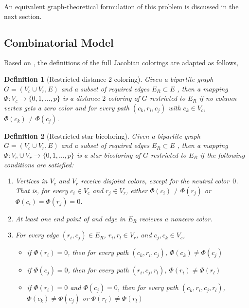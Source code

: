 \documentclass[12pt, oneside]{book}
\newtheorem{definition}{Definition}
\begin{document}
An equivalent graph-theoretical formulation of this problem is discussed in the next
section.

\subsection{Combinatorial Model}
Based on \cite{Gebremedhin05whatcolor,Lulfesmann2012Fap}, the definitions
of the full Jacobian colorings are adapted as follows,
\begin{definition}[Restricted distance-$2$ coloring]\label{d.coloring.d2}
Given a bipartite graph $G=(V_c\cup V_r, E)$ and a subset of required edges
$E_R\subset E$ , then a mapping $\Phi:V_c \to
\{0,1,\dots ,p\}$ is a distance-$2$ coloring
of $G$ restricted to $E_R$ if no column vertex gets a zero color and
for every path $(c_k,r_i,c_j)$ with $c_k\in V_c$, 
$\Phi(c_k) \neq \Phi(c_j)$.
\end{definition}
\begin{definition}[Restricted star bicoloring]\label{d.coloring.bicol}
Given a bipartite graph $G=(V_c\cup V_r, E)$ and a subset of required edges
$E_R\subset E$ , then a mapping $\Phi:V_c \cup V_r \to
\{0,1,\dots ,p\}$ is a star bicoloring of $G$ restricted to $E_R$
if the following conditions are satisfied:
\begin{enumerate}
\item Vertices in $V_c$ and $V_r$ receive disjoint colors, except for the neutral color~$0$. That
    is, for every $c_i \in V_c$ and $r_j \in V_r$, either $\Phi(c_i) \neq \Phi(r_j)$ or
    $\Phi(c_i)=\Phi(r_j)=0$.

\item At least one end point of and edge in $E_R$ recieves a nonzero color. 
\item For every edge $(r_i,c_j)\in E_R$, $r_i, r_l\in V_r$, and 
$c_j, c_k\in V_c$,
\begin{itemize}
\item if $\Phi (r_i) = 0$, then for every path $(c_k,r_i,c_j)$, $\Phi (c_k)\neq \Phi (c_j)$
\item if $\Phi (c_j) = 0$, then for every path $(r_i,c_j,r_l)$, $\Phi (r_i)\neq \Phi (r_l)$
\item if $\Phi (r_i) = 0$ and $\Phi (c_j) = 0$, then for every path $(c_k,r_i,c_j,r_l)$, 
$\Phi (c_k)\neq \Phi (c_j)$ or $\Phi (r_i)\neq \Phi (r_l)$
\end{itemize} 
\end{enumerate}
\end{definition}
\end{document}
